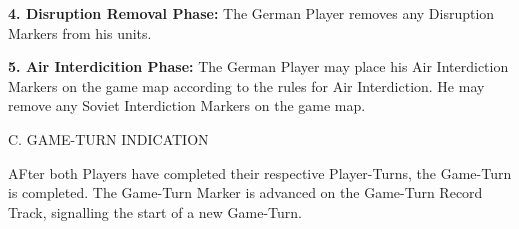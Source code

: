 \textbf{4. Disruption Removal Phase:} The German Player removes any Disruption Markers from his units.

\textbf{5. Air Interdicition Phase:} The German Player may place his Air Interdiction Markers on the game map according to the rules for Air Interdiction. He may remove any Soviet Interdiction Markers on the game map.

C. GAME-TURN INDICATION

AFter both Players have completed their respective Player-Turns, the Game-Turn is completed. The Game-Turn Marker is advanced on the Game-Turn Record Track, signalling the start of a new Game-Turn.